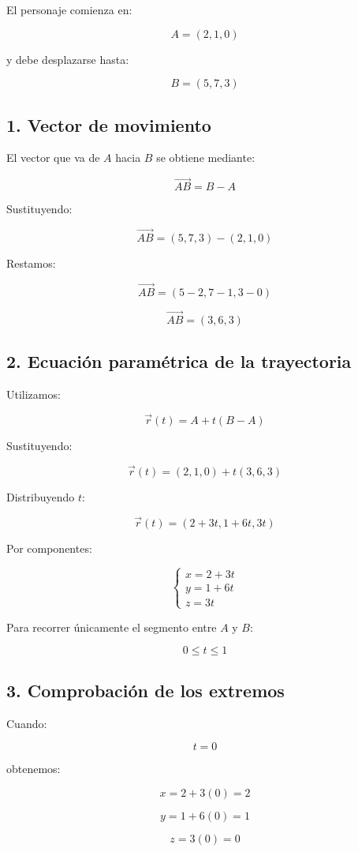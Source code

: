 \documentclass[12pt,a4paper]{article}
\begin{document}
El personaje comienza en:

\[A=(2,1,0)\]

y debe desplazarse hasta:

\[B=(5,7,3)\]

\subsection{1. Vector de movimiento}

El vector que va de $A$ hacia $B$ se obtiene mediante:

\[\vec{AB}=B-A\]

Sustituyendo:

\[\vec{AB}=(5,7,3)-(2,1,0)\]

Restamos:

\[\vec{AB}=(5-2,7-1,3-0)\]

\[\boxed{\vec{AB}=(3,6,3)}\]

\subsection{2. Ecuación paramétrica de la trayectoria}

Utilizamos:

\[\vec{r}(t)=A+t(B-A)\]

Sustituyendo:

\[\vec{r}(t)=(2,1,0)+t(3,6,3)\]

Distribuyendo $t$:

\[\boxed{\vec{r}(t)=(2+3t,1+6t,3t)}\]

Por componentes:

\[\boxed{
\begin{cases}
x=2+3t\\
y=1+6t\\
z=3t
\end{cases}
}\]

Para recorrer únicamente el segmento entre $A$ y $B$:

\[\boxed{0\leq t\leq1}\]

\subsection{3. Comprobación de los extremos}

Cuando:

\[t=0\]

obtenemos:

\[x=2+3(0)=2\]

\[y=1+6(0)=1\]

\[z=3(0)=0\]
\end{document}
